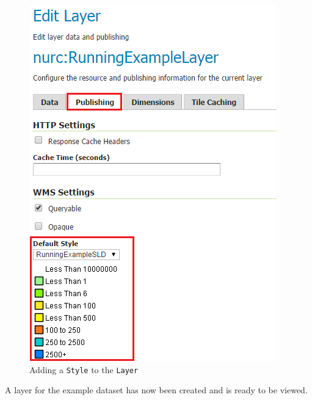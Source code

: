 \begin{minipage}{.45\textwidth}
	\begin{figure}[H]
		\centering
		\includegraphics[width=\textwidth]{Figures/EditLayer_Publishing.png}
		\vspace{-5pt}
		\caption{Adding a \lstinline|Style| to the \lstinline|Layer| \label{fig:layerpublish}}
	\end{figure}
\end{minipage}

\vspace{10pt}
\noindent A layer for the example dataset has now been created and is ready to be viewed.


\pagebreak
